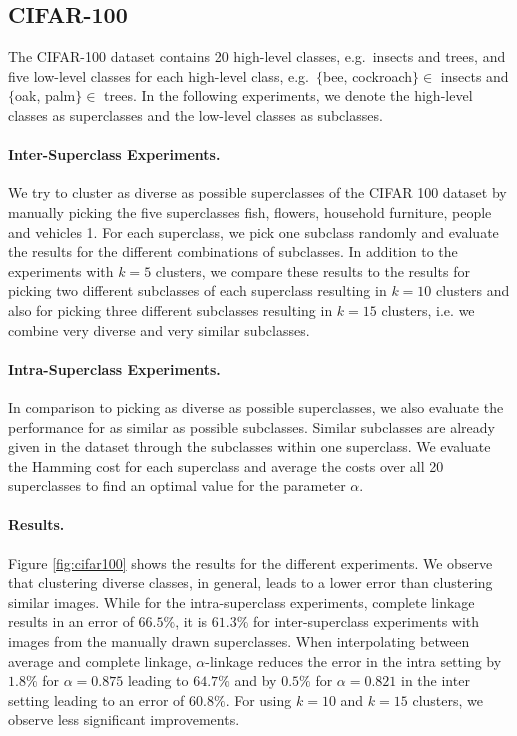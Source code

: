 \subsection{CIFAR-100}

The CIFAR-100 dataset contains 20 high-level classes, e.g.\ insects and trees, and five low-level classes for each high-level class, e.g.\ $\{$bee, cockroach$\} \in$ insects and $\{$oak, palm$\} \in$ trees. In the following experiments, we denote the high-level classes as superclasses and the low-level classes as subclasses.

\paragraph{Inter-Superclass Experiments.} We try to cluster as diverse as possible superclasses of the CIFAR 100 dataset by manually picking the five superclasses fish, flowers, household furniture, people and vehicles 1. For each superclass, we pick one subclass randomly and evaluate the results for the different combinations of subclasses. In addition to the experiments with $k = 5$ clusters, we compare these results to the results for picking two different subclasses of each superclass resulting in $k = 10$ clusters and also for picking three different subclasses resulting in $k = 15$ clusters, i.e. we combine very diverse and very similar subclasses.

\paragraph{Intra-Superclass Experiments.} In comparison to picking as diverse as possible superclasses, we also evaluate the performance for as similar as possible subclasses. Similar subclasses are already given in the dataset through the subclasses within one superclass. We evaluate the Hamming cost for each superclass and average the costs over all 20 superclasses to find an optimal value for the parameter $\alpha$. 

\paragraph{Results.} Figure \ref{fig:cifar100} shows the results for the different experiments. We observe that clustering diverse classes, in general, leads to a lower error than clustering similar images. While for the intra-superclass experiments, complete linkage results in an error of $66.5\%$, it is $61.3\%$ for inter-superclass experiments with images from the manually drawn superclasses. When interpolating between average and complete linkage, $\alpha$-linkage reduces the error in the intra setting by $1.8\%$ for $\alpha = 0.875$ leading to $64.7\%$ and by $0.5\%$ for $\alpha = 0.821$ in the inter setting leading to an error of $60.8\%$. For using $k = 10$ and $k = 15$ clusters, we observe less significant improvements.


